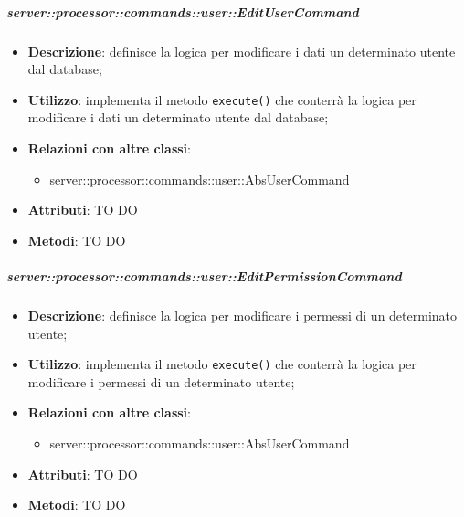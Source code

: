         \subparagraph{server::processor::commands::user::EditUserCommand} %
        \label{subp:bdsm_app_server_processor_commands_user_editusercommand}
        \begin{itemize}
          \item \textbf{Descrizione}: definisce la logica per modificare i dati un determinato utente dal database;
          \item \textbf{Utilizzo}: implementa il metodo \texttt{execute()} che conterrà la logica per modificare i dati un determinato utente dal database;
          \item \textbf{Relazioni con altre classi}:
            \begin{itemize}
              \item server::processor::commands::user::AbsUserCommand
            \end{itemize}
			\item \textbf{Attributi}: TO DO
			\item \textbf{Metodi}: TO DO
        \end{itemize}

        \subparagraph{server::processor::commands::user::EditPermissionCommand} %
        \label{subp:bdsm_app_server_processor_commands_user_editpermissioncommand}
        \begin{itemize}
          \item \textbf{Descrizione}: definisce la logica per modificare i permessi di un determinato utente;
          \item \textbf{Utilizzo}: implementa il metodo \texttt{execute()} che conterrà la logica per modificare i permessi di un determinato utente;
          \item \textbf{Relazioni con altre classi}:
            \begin{itemize}
              \item server::processor::commands::user::AbsUserCommand
            \end{itemize}
			\item \textbf{Attributi}: TO DO
			\item \textbf{Metodi}: TO DO
        \end{itemize}

